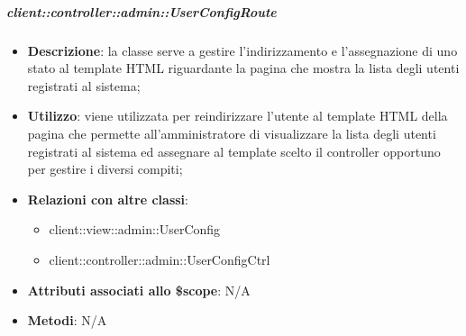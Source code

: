 		\subparagraph{client::controller::admin::UserConfigRoute} %
		\label{subp:bdsm_app_client_controller_admin_userconfigroute}

			\begin{itemize}
				\item \textbf{Descrizione}: la classe serve a gestire l'indirizzamento e l'assegnazione di uno stato al template HTML riguardante la pagina che mostra la lista degli utenti registrati al sistema;
				\item \textbf{Utilizzo}: viene utilizzata per reindirizzare l'utente al template HTML della pagina che permette all'amministratore di visualizzare la lista degli utenti registrati al sistema ed assegnare al template scelto il controller opportuno per gestire i diversi compiti;
				\item \textbf{Relazioni con altre classi}:
					\begin{itemize}
						\item client::view::admin::UserConfig
						\item client::controller::admin::UserConfigCtrl
					\end{itemize}
				\item \textbf{Attributi associati allo \$scope}: N/A
				\item \textbf{Metodi}: N/A
			\end{itemize}

